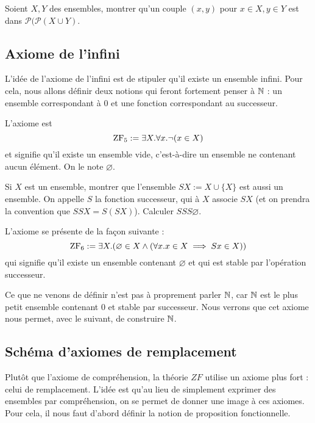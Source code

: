 \begin{exo}
    Soient $X,Y$ des ensembles, montrer qu'un couple $(x,y)$ pour $x\in X, y\in Y$ est dans $\mathcal P (\mathcal P(X\cup Y)$.
\end{exo}

\subsection{Axiome de l'infini}

L'idée de l'axiome de l'infini est de stipuler qu'il existe un ensemble infini. Pour cela, nous allons définir deux notions qui feront fortement penser à $\mathbb{N}$ : un ensemble correspondant à $0$ et une \og fonction \fg{} correspondant au successeur.

\begin{ax}
    L'axiome est $$\mathrm{ZF}_5:=\exists X. \forall x. \lnot(x\in X)$$ et signifie qu'il existe un ensemble vide, c'est-à-dire un ensemble ne contenant aucun élément. On le note $\varnothing$.
\end{ax}

\begin{exo}
    Si $X$ est un ensemble, montrer que l'ensemble $SX := X \cup \{X\}$ est aussi un ensemble. On appelle $S$ la fonction successeur, qui à $X$ associe $SX$ (et on prendra la convention que $SSX = S(SX)$). Calculer $SSS\varnothing$.
\end{exo}

\begin{ax}[Infini]
    L'axiome se présente de la façon suivante : $$\mathrm{ZF}_6 := \exists X.(\varnothing\in X \land (\forall x. x\in X \implies Sx\in X))$$ qui signifie qu'il existe un ensemble contenant $\varnothing$ et qui est stable par l'opération successeur.
\end{ax}

\begin{rmk}
    Ce que ne venons de définir n'est pas à proprement parler $\mathbb{N}$, car $\mathbb{N}$ est le plus petit ensemble contenant $0$ et stable par successeur. Nous verrons que cet axiome nous permet, avec le suivant, de construire $\mathbb{N}$.
\end{rmk}

\subsection{Schéma d'axiomes de remplacement}

Plutôt que l'axiome de compréhension, la théorie $ZF$ utilise un axiome plus fort : celui de remplacement. L'idée est qu'au lieu de simplement exprimer des ensembles par compréhension, on se permet de donner une image à ces axiomes. Pour cela, il nous faut d'abord définir la notion de proposition fonctionnelle.

